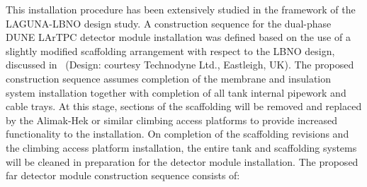 This installation procedure has been extensively studied in the
framework of the LAGUNA-LBNO design study. A construction sequence for
the dual-phase DUNE LArTPC detector module installation was defined based on
the use of a slightly modified scaffolding arrangement with respect to
the LBNO design, discussed in \anxlbnob\ (Design: courtesy Technodyne
Ltd., Eastleigh, UK). The proposed construction sequence assumes
completion of the membrane and insulation system installation together
with completion of all tank internal pipework and cable trays.  At
this stage, sections of the scaffolding will be removed and replaced
by the Alimak-Hek or similar climbing access platforms to provide
increased functionality to the installation.  On completion of the
scaffolding revisions and the climbing access platform installation,
the entire tank and scaffolding systems will be cleaned in preparation
for the detector module installation. The proposed far detector module construction
sequence consists of:
